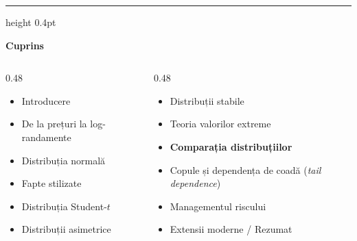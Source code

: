 \documentclass[9pt, aspectratio=169, t]{beamer}
\theoremstyle{definition}
\begin{document}
{
\begin{frame}{}
    {\color{FooterGray}\hrule height 0.4pt}
    \vspace{0.1cm}
    {\Large\textcolor{IDAred}{\textbf{Cuprins}}}
    \vspace{0.2cm}
    {\small
    \begin{columns}[T]
        \begin{column}{0.48\textwidth}
            \begin{itemize}
                \item Introducere \checkmark
                \item De la prețuri la log-randamente \checkmark
                \item Distribuția normală \checkmark
                \item Fapte stilizate \checkmark
                \item Distribuția Student-$t$ \checkmark
                \item Distribuții asimetrice \checkmark
            \end{itemize}
        \end{column}
        \begin{column}{0.48\textwidth}
            \begin{itemize}
                \item Distribuții stabile \checkmark
                \item Teoria valorilor extreme \checkmark
                \item \textbf{Comparația distribuțiilor}
                \item Copule și dependența de coadă (\textit{tail dependence})
                \item Managementul riscului
                \item Extensii moderne / Rezumat
            \end{itemize}
        \end{column}
    \end{columns}
    }
\end{frame}
}

\end{document}
